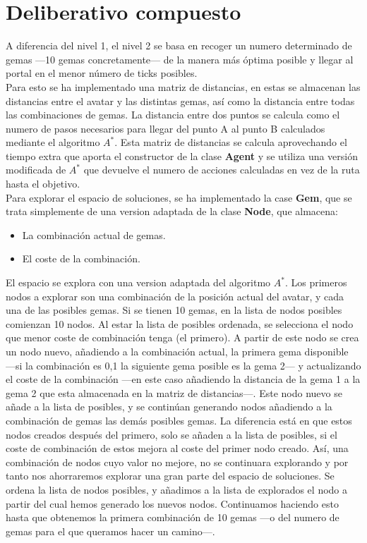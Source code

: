 \section{Deliberativo compuesto}
A diferencia del nivel 1, el nivel 2 se basa en recoger un numero determinado de gemas ---10 gemas concretamente--- de la manera más óptima posible y llegar al portal en el menor número de ticks posibles.
\\
Para esto se ha implementado una matriz de distancias, en estas se almacenan las distancias entre el avatar y las distintas gemas, así como la distancia entre todas las combinaciones de gemas. La distancia entre dos puntos se calcula como el numero de pasos necesarios para llegar del punto A al punto B calculados mediante el algoritmo $ A^{*} $. Esta matriz de distancias se calcula aprovechando el tiempo extra que aporta el constructor de la clase \textbf{Agent} y se utiliza una versión modificada de $ A^{*} $ que devuelve el numero de acciones calculadas en vez de la ruta hasta el objetivo.\\
Para explorar el espacio de soluciones, se ha implementado la case \textbf{Gem}, que se trata simplemente de una version adaptada de la clase \textbf{Node}, que almacena:
\begin{itemize}
   \item La combinación actual de gemas.
   \item El coste de la combinación.
\end{itemize}
El espacio se explora con una version adaptada del algoritmo $ A^{*} $. Los primeros nodos a explorar son una combinación de la posición actual del avatar, y cada una de las posibles gemas. Si se tienen 10 gemas, en la lista de nodos posibles comienzan 10 nodos. Al estar la lista de posibles ordenada, se selecciona el nodo que menor coste de combinación tenga (el primero). A partir de este nodo se crea un nodo nuevo, añadiendo a la combinación actual, la primera gema disponible ---si la combinación es 0,1 la siguiente gema posible es la gema 2--- y actualizando el coste de la combinación ---en este caso añadiendo la distancia de la gema 1 a la gema 2 que esta almacenada en la matriz de distancias---. Este nodo nuevo se añade a la lista de posibles, y se continúan generando nodos añadiendo a la combinación de gemas las demás posibles gemas. La diferencia está en que estos nodos creados después del primero, solo se añaden a la lista de posibles, si el coste de combinación de estos mejora al coste del primer nodo creado. Así, una combinación de nodos cuyo valor no mejore, no se continuara explorando y por tanto nos ahorraremos explorar una gran parte del espacio de soluciones. Se ordena la lista de nodos posibles, y añadimos a la lista de explorados el nodo a partir del cual hemos generado los nuevos nodos. Continuamos haciendo esto hasta que obtenemos la primera combinación de 10 gemas ---o del numero de gemas para el que queramos hacer un camino---.\\

